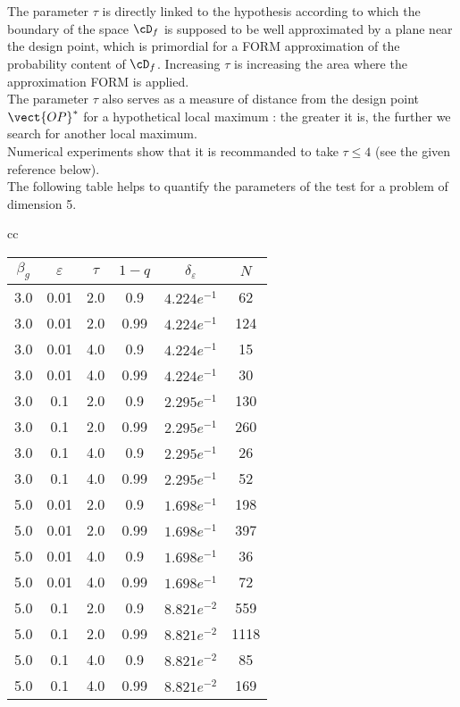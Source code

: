 {
  The parameter $\tau$ is directly linked to the hypothesis according to which the boundary of the space $\cD_f$ is supposed to be well approximated by a plane near the design point, which is primordial for a FORM approximation of the probability content of $\cD_f$. Increasing $\tau$ is increasing the  area where the approximation FORM is applied. \\
  The parameter $\tau$ also serves as a measure of distance from the design point $\vect{OP}^*$ for a hypothetical local maximum : the greater it is, the further we search for another local maximum.\\
  Numerical experiments show that it is recommanded to take $\tau \leq 4$ (see the given reference below).\\

  The following table  helps to quantify the parameters of the test for a problem of dimension 5.

  \begin{center}

    \begin{tabular}{cc}

      \begin{tabular}{|c|c|c|c|c|c|}
        \hline
        $\beta_g$ & $\varepsilon$  & $\tau$  & $1-q$  & $\delta_{\varepsilon}$  & $N$ \\
        \hline
        3.0  & 0.01  & 2.0 &  0.9   & $4.224 e^{-1}$  &62\\
        \hline
        3.0   &0.01  & 2.0  & 0.99  & $4.224 e^{-1}$ & 124\\
        \hline
        3.0   &0.01  & 4.0  & 0.9   &$4.224 e^{-1}$ &15\\
        \hline
        3.0   &0.01  & 4.0  & 0.99  & $4.224 e^{-1}$ & 30\\
        \hline
        3.0   &0.1   &2.0  & 0.9   &$2.295 e^{-1}$ & 130\\
        \hline
        3.0   &0.1  & 2.0  & 0.99 &  $2.295 e^{-1}$ & 260\\
        \hline
        3.0   &0.1  & 4.0  & 0.9  & $2.295 e^{-1}$ & 26\\
        \hline
        3.0   &0.1   &4.0  & 0.99  & $2.295  e^{-1}$& 52\\
        \hline
        5.0   &0.01  & 2.0  & 0.9 &  $1.698 e^{-1}$  &198\\
        \hline
        5.0   &0.01  & 2.0 &  0.99  & $1.698 e^{-1}$ & 397\\
        \hline
        5.0   &0.01  &4.0 &  0.9   & $1.698 e^{-1}$ & 36\\
        \hline
        5.0   &0.01   &4.0  & 0.99  & $1.698 e^{-1}$ & 72\\
        \hline
        5.0   &0.1  & 2.0  & 0.9  & $8.821  e^{-2}$& 559\\
        \hline
        5.0   &0.1  & 2.0  & 0.99   & $8.821 e^{-2}$  &1118\\
        \hline
        5.0   &0.1  & 4.0  & 0.9   & $8.821  e^{-2}$ &85\\
        \hline
        5.0   &0.1  & 4.0 &  0.99   & $8.821 e^{-2}$   &169\\
        \hline
      \end{tabular}


\end{tabular}
\end{center}}
